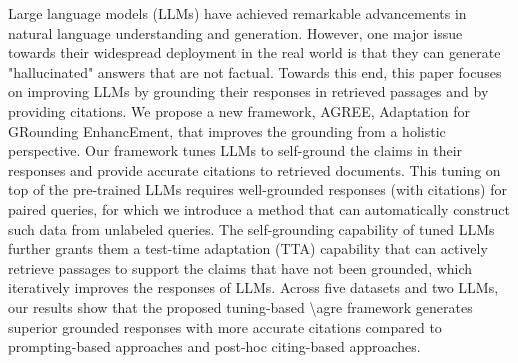 Large language models (LLMs) have achieved remarkable advancements in natural language understanding and generation. However, one major issue towards their widespread deployment in the real world is that they can generate "hallucinated" answers that are not factual. Towards this end, this paper focuses on improving LLMs by grounding their responses in retrieved passages and by providing citations. We propose a new framework, AGREE, Adaptation for GRounding EnhancEment, that improves the grounding from a holistic perspective. Our framework tunes LLMs to self-ground the claims in their responses and provide accurate citations to retrieved documents. This tuning on top of the pre-trained LLMs requires well-grounded responses (with citations) for paired queries, for which we introduce a method that can automatically construct such data from unlabeled queries. The self-grounding capability of tuned LLMs further grants them a test-time adaptation (TTA) capability that can actively retrieve passages to support the claims that have not been grounded, which iteratively improves the responses of LLMs. Across five datasets and two LLMs, our results show that the proposed tuning-based \textbackslash{}agre{} framework generates superior grounded responses with more accurate citations compared to prompting-based approaches and post-hoc citing-based approaches.